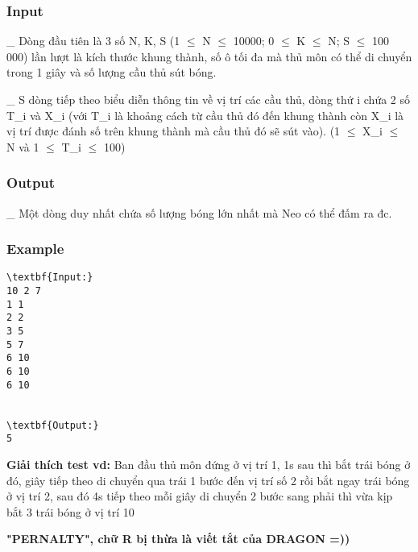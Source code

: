 \subsubsection{   Input  }

   \_ Dòng đầu tiên là 3 số N, K, S (1 $\le$  N  $\le$ 10000; 0 $\le$  K  $\le$ N; S $\le$ 100 000) lần lượt là kích thước khung thành, số ô tối đa mà thủ môn có thể di chuyển trong 1 giây và số lượng cầu thủ sút bóng.   


   \_ S dòng tiếp theo biểu diễn thông tin về vị trí các cầu thủ, dòng thứ i chứa 2 số T\_i và X\_i (với T\_i là khoảng cách từ cầu thủ đó đến khung thành còn X\_i là vị trí được đánh số trên khung thành mà cầu thủ đó sẽ sút vào). (1 $\le$  X\_i  $\le$ N và 1 $\le$  T\_i  $\le$ 100)  

\subsubsection{   Output  }

   \_ Một dòng duy nhất chứa số lượng bóng lớn nhất mà Neo có thể đấm ra đc.  

\subsubsection{   Example  }
\begin{verbatim}
\textbf{Input:}
10 2 7
1 1
2 2
3 5
5 7
6 10
6 10
6 10


\textbf{Output:}
5
\end{verbatim}

\textbf{    Giải thích test vd:   }   Ban đầu thủ môn đứng ở vị trí 1, 1s sau thì bắt trái bóng ở đó, giây tiếp theo di chuyển qua trái 1 bước đến vị trí số 2 rồi bắt ngay trái bóng ở vị trí 2, sau đó 4s tiếp theo mỗi giây di chuyển 2 bước sang phải thì vừa kịp bắt 3 trái bóng ở vị trí 10   


\textbf{    "PERNALTY", chữ R bị thừa là viết tắt của DRAGON =))   }

